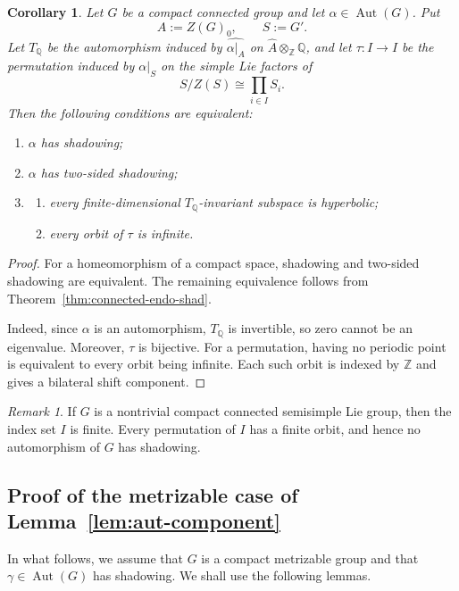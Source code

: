 \documentclass[12pt]{amsart}
\newtheorem{corollary}[theorem]{Corollary}
\theoremstyle{definition}
\numberwithin{equation}{section}
\theoremstyle{remark}
\newtheorem{remark}[theorem]{Remark}
\def\Aut{\operatorname{Aut}}
\begin{document}
\begin{corollary}\label{cor:connected-aut-shadowing}
Let $G$ be a compact connected group and let
$\alpha\in\operatorname{Aut}(G)$. Put
\[
A:=Z(G)_0,
\qquad
S:=G'.
\]
Let $T_{\mathbb Q}$ be the automorphism induced by
$\widehat{\alpha|_A}$ on
$\widehat A\otimes_{\mathbb Z}\mathbb Q$, and let
$\tau:I\to I$ be the permutation induced by $\alpha|_S$ on the simple
Lie factors of
\[
S/Z(S)\cong\prod_{i\in I}S_i.
\]
Then the following conditions are equivalent:
\begin{enumerate}
\item $\alpha$ has shadowing;
\item $\alpha$ has two-sided shadowing;
\item
\begin{enumerate}
\item every finite-dimensional $T_{\mathbb Q}$-invariant subspace is
hyperbolic;
\item every orbit of $\tau$ is infinite.
\end{enumerate}
\end{enumerate}
\end{corollary}

\begin{proof}
For a homeomorphism of a compact space, shadowing and two-sided
shadowing are equivalent. The remaining equivalence follows from
Theorem~\ref{thm:connected-endo-shad}.

Indeed, since $\alpha$ is an automorphism, $T_{\mathbb Q}$ is
invertible, so zero cannot be an eigenvalue. Moreover, $\tau$ is
bijective. For a permutation, having no periodic point is equivalent
to every orbit being infinite. Each such orbit is indexed by
$\mathbb Z$ and gives a bilateral shift component.
\end{proof}

\begin{remark}
If $G$ is a nontrivial compact connected semisimple Lie group, then
the index set $I$ is finite. Every permutation of $I$ has a finite
orbit, and hence no automorphism of $G$ has shadowing.
\end{remark}

\subsection{Proof of the metrizable case of
	Lemma~\ref{lem:aut-component}}\label{subsec}

In what follows, we assume that $G$ is a compact metrizable group and
that $\gamma\in\Aut(G)$ has shadowing. We shall use the following
lemmas.
\end{document}
